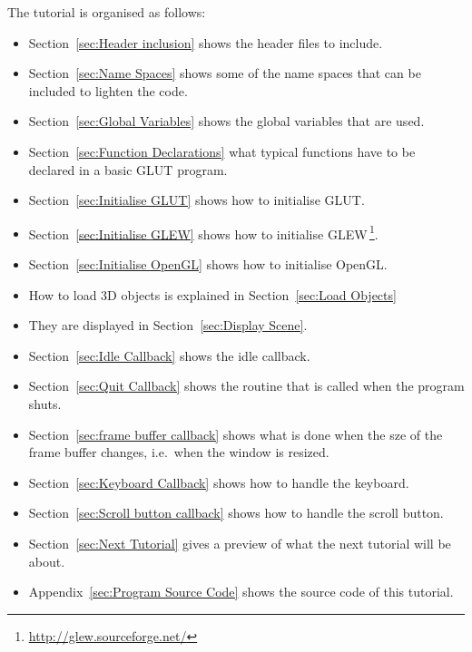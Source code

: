 \documentclass[11pt,oneside,a4paper,final]{article}
\begin{document}
The tutorial is organised as follows:
\begin{itemize}
 \item Section~\ref{sec:Header inclusion} shows the header files to include. 

 \item Section~\ref{sec:Name Spaces} shows some of the name spaces that can be 
	included to lighten the code. 

 \item Section~\ref{sec:Global Variables} shows the global variables that are 
	used. 

 \item Section~\ref{sec:Function Declarations} what typical functions have to 
	be declared in a basic GLUT program. 

 \item Section~\ref{sec:Initialise GLUT} shows how to initialise GLUT. 

 \item Section~\ref{sec:Initialise GLEW} shows how to initialise 
    GLEW\,\footnote{\url{http://glew.sourceforge.net/}}. 

 \item Section~\ref{sec:Initialise OpenGL} shows how to initialise OpenGL. 

 \item How to load 3D objects is explained in Section~\ref{sec:Load Objects} 

 \item They are displayed in Section~\ref{sec:Display Scene}.

 \item Section~\ref{sec:Idle Callback} shows the idle callback. 

 \item Section~\ref{sec:Quit Callback} shows the routine that is called when 
  the program shuts.

 \item Section~\ref{sec:frame buffer callback} shows what is done when the sze 
of the frame buffer changes, i.e.~when the window is resized.

 \item Section~\ref{sec:Keyboard Callback} shows how to handle the keyboard.

 \item Section~\ref{sec:Scroll button callback} shows how to handle the 
  scroll button.
  
 \item Section~\ref{sec:Next Tutorial} gives a preview of what the next 
  tutorial will be about.
 
 \item Appendix~\ref{sec:Program Source Code} shows the source code of this 
	tutorial. 
	
\end{itemize}
\end{document}
